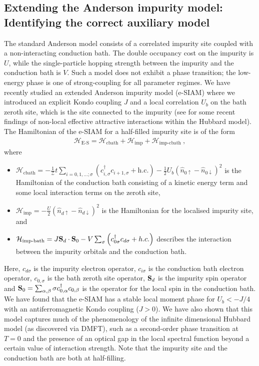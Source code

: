 \documentclass[reprint,hidelinks]{revtex4-2}
\begin{document}
\subsection{Extending the Anderson impurity model: Identifying the correct auxiliary model}
The standard Anderson model consists of a correlated impurity site coupled with a non-interacting conduction bath. The double occupancy cost on the impurity is \(U\), while the single-particle hopping strength between the impurity and the conduction bath is \(V\). Such a model does not exhibit a phase transition; the low-energy phase is one of strong-coupling for all parameter regimes. We have recently studied an extended Anderson impurity model (e-SIAM) where we introduced an explicit Kondo coupling \(J\) and a local correlation \(U_b\) on the bath zeroth site, which is the site connected to the impurity (see \cite{gazizovaleblanc2023} for some recent findings of non-local effective attractive interactions within the Hubbard model). The Hamiltonian of the e-SIAM for a half-filled impurity site is of the form
\begin{equation}\begin{aligned}
	\label{siam_attr}
	\mathcal{H}_\text{E-S} = \mathcal{H}_\text{cbath} + \mathcal{H}_\text{imp} + \mathcal{H}_\text{imp-cbath}~,
\end{aligned}\end{equation}
where 
\begin{itemize}
	\item \(\mathcal{H}_\text{cbath} = -\frac{1}{\mathcal{Z}}t\sum_{i=0,1,\ldots;\sigma}\left(c^\dagger_{i,\sigma}c_{i+1,\sigma} + \text{h.c.}\right) - \frac{1}{2}U_b\left(\hat n_{0 \uparrow} - \hat n_{0 \downarrow}\right)^2\) is the Hamiltonian of the conduction bath consisting of a kinetic energy term and some local interaction terms on the zeroth site,
	\item \(\mathcal{H}_\text{imp} = - \frac{U}{2}\left(\hat n_{d \uparrow} - \hat n_{d \downarrow} \right) ^2\) is the Hamiltonian for the localised impurity site, and
	\item \(\mathcal{H}_\text{imp-bath} = J {\bf S}_d\cdot{\bf S}_0 - V \sum_{\sigma} \left(c^\dagger_{0\sigma} c_{d\sigma} + h.c.\right)\) describes the interaction between the impurity orbitals and the conduction bath.
\end{itemize}
Here, \(c_{d\sigma}\) is the impurity electron operator, \(c_{i\sigma}\) is the conduction bath electron operator, \(c_{0,\sigma}\) is the bath zeroth site operator, \({\bf S}_d\) is the impurity spin operator and \({\bf S}_0 = \sum_{\alpha,\beta}{\bf \sigma}c^\dagger_{0,\alpha}c_{0,\beta}\) is the operator for the local spin in the conduction bath. We have found that the e-SIAM has a stable local moment phase for \(U_b < -J/4\) with an antiferromagnetic Kondo coupling (\(J > 0\)). We have also shown that this model captures much of the phenomenology of the infinite dimensional Hubbard model (as discovered via DMFT), such as a second-order phase transition at \(T=0\) and the presence of an optical gap in the local spectral function beyond a certain value of interaction strength. Note that the impurity site and the conduction bath are both at half-filling.
\end{document}
